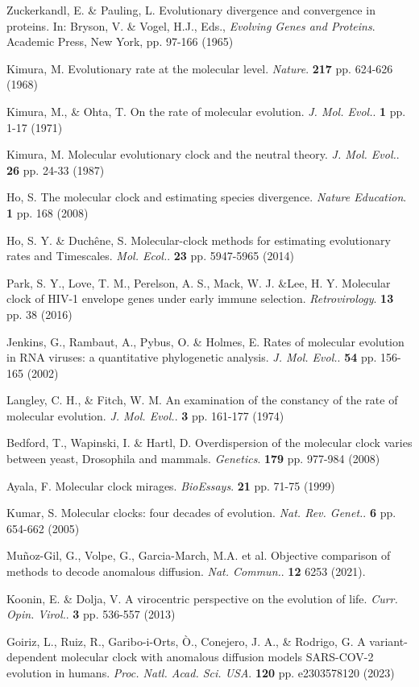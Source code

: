 \documentclass{./LatexTemplate/svproc}
\begin{document}
%
%
\begin{thebibliography}{6}

Zuckerkandl, E. \& Pauling, L. Evolutionary divergence and convergence in proteins. In: Bryson, V. \& Vogel, H.J., Eds., {\em Evolving Genes and Proteins}. Academic Press, New York, pp. 97-166 (1965)

Kimura, M. Evolutionary rate at the molecular level. {\em Nature}. \textbf{217} pp. 624-626 (1968)

Kimura, M., \& Ohta, T. On the rate of molecular evolution. {\em J. Mol. Evol.}. \textbf{1} pp. 1-17 (1971)

Kimura, M. Molecular evolutionary clock and the neutral theory. {\em J. Mol. Evol.}. \textbf{26} pp. 24-33 (1987)

Ho, S. The molecular clock and estimating species divergence. {\em Nature Education}. \textbf{1} pp. 168 (2008)

Ho, S. Y. \& Duchêne, S. Molecular-clock methods for estimating evolutionary rates and Timescales. {\em Mol. Ecol.}. \textbf{23} pp. 5947-5965 (2014)

Park, S. Y., Love, T. M., Perelson, A. S., Mack, W. J. \&Lee, H. Y. Molecular clock of HIV-1 envelope genes under early immune selection. {\em Retrovirology}. \textbf{13} pp. 38 (2016) 

Jenkins, G., Rambaut, A., Pybus, O. \& Holmes, E. Rates of molecular evolution in RNA viruses: a quantitative phylogenetic analysis. {\em J. Mol. Evol.}. \textbf{54} pp. 156-165 (2002)

Langley, C. H., \& Fitch, W. M. An examination of the constancy of the rate of molecular evolution. {\em 	J. Mol. Evol.}. \textbf{3} pp. 161-177 (1974)

Bedford, T., Wapinski, I. \& Hartl, D. Overdispersion of the molecular clock varies between yeast, Drosophila and mammals. {\em Genetics}. \textbf{179} pp. 977-984 (2008)

Ayala, F. Molecular clock mirages. {\em BioEssays}. \textbf{21} pp. 71-75 (1999)

Kumar, S. Molecular clocks: four decades of evolution. {\em Nat. Rev. Genet.}. \textbf{6} pp. 654-662 (2005)

 Muñoz-Gil, G., Volpe, G., Garcia-March, M.A. et al. Objective comparison of methods to decode anomalous diffusion. {\em Nat. Commun.}. \textbf{12} 6253 (2021).

Koonin, E. \& Dolja, V. A virocentric perspective on the evolution of life. {\em Curr. Opin. Virol.}. \textbf{3} pp. 536-557 (2013)

Goiriz, L., Ruiz, R., Garibo-i-Orts, Ò., Conejero, J. A., \& Rodrigo, G. A variant-dependent molecular clock with anomalous diffusion models SARS-COV-2 evolution in humans. {\em Proc. Natl. Acad. Sci. USA}. \textbf{120} pp. e2303578120 (2023)

\end{thebibliography}
\end{document}
